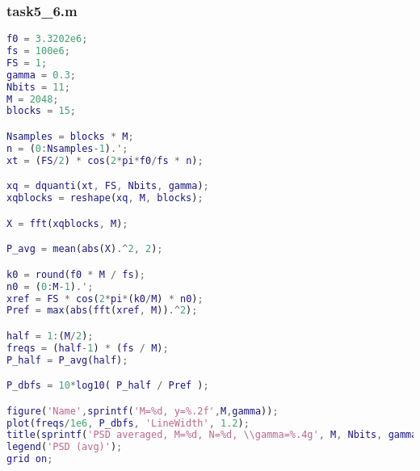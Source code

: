 \subsubsection{task5\_6.m}
\begin{lstlisting}[language=Matlab]
f0 = 3.3202e6;
fs = 100e6;
FS = 1;
gamma = 0.3;
Nbits = 11;
M = 2048;
blocks = 15;

Nsamples = blocks * M;
n = (0:Nsamples-1).';
xt = (FS/2) * cos(2*pi*f0/fs * n);

xq = dquanti(xt, FS, Nbits, gamma);
xqblocks = reshape(xq, M, blocks);

X = fft(xqblocks, M);

P_avg = mean(abs(X).^2, 2);

k0 = round(f0 * M / fs);
n0 = (0:M-1).';
xref = FS * cos(2*pi*(k0/M) * n0);
Pref = max(abs(fft(xref, M)).^2);

half = 1:(M/2);
freqs = (half-1) * (fs / M);
P_half = P_avg(half);

P_dbfs = 10*log10( P_half / Pref );

figure('Name',sprintf('M=%d, y=%.2f',M,gamma));
plot(freqs/1e6, P_dbfs, 'LineWidth', 1.2);
title(sprintf('PSD averaged, M=%d, N=%d, \\gamma=%.4g', M, Nbits, gamma));
legend('PSD (avg)');
grid on;

\end{lstlisting}
